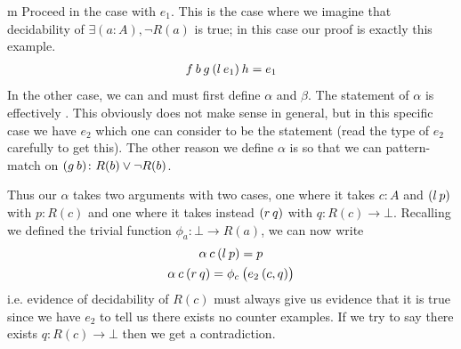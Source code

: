 \documentclass[11pt]{article}
\begin{document}
\begin{my proof}{m}
Proceed in the case with $e_1$. This is the case where we imagine that decidability of $\exists (a : A), \neg R(a)$ is true; in this case our proof is exactly this example. \begin{gather*}
f \hspace{0.2em} b \hspace{0.2em} g \hspace{0.2em} (l \hspace{0.2em} e_1) \hspace{0.2em} h = e_1
\end{gather*}
In the other case, we can and must first define $\alpha$ and $\beta$. The statement of $\alpha$ is effectively . This obviously does not make sense in general, but in this specific case we have $e_2$ which one can consider to be the statement  (read the type of $e_2$ carefully to get this). The other reason we define $\alpha$ is so that we can pattern-match on $(g \hspace{0.2em} b) \colon R(b) \vee \neg R(b)$.

Thus our $\alpha$ takes two arguments with two cases, one where it takes $c\colon A$ and $(l \hspace{0.2em} p)$ with $p \colon R(c)$ and one where it takes instead $(r \hspace{0.2em} q)$ with $q \colon R(c) \to \bot$. Recalling we defined the trivial function $\phi_a \colon \bot \to R(a)$, we can now write \begin{gather*}
\alpha \hspace{0.2em} c \hspace{0.2em} (l \hspace{0.2em} p) = p \\
\alpha \hspace{0.2em} c \hspace{0.2em} (r \hspace{0.2em} q) = \phi_c \hspace{0.2em} \big( e_2 \hspace{0.2em} (c , q)\big)
\end{gather*}
i.e. evidence of decidability of $R(c)$ must always give us evidence that it is true since we have $e_2$ to tell us there exists no counter examples. If we try to say there exists $q \colon R(c) \to \bot$ then we get a contradiction.


\end{my proof}
\end{document}
